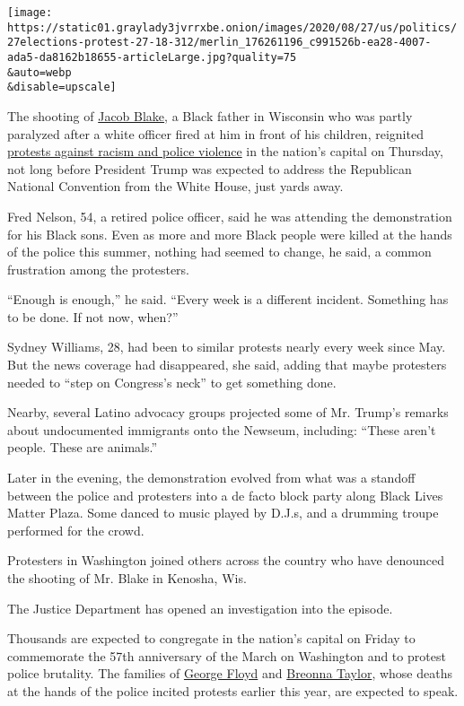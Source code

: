 \texttt{[image: https://static01.graylady3jvrrxbe.onion/images/2020/08/27/us/politics/27elections-protest-27-18-312/merlin\_176261196\_c991526b-ea28-4007-ada5-da8162b18655-articleLarge.jpg?quality=75\\\&auto=webp\\\&disable=upscale]}

The shooting of
\href{https://www.nytimes3xbfgragh.onion/2020/08/27/us/kenosha-shooting-protests.html?name=styln-george-floyd\&region=TOP_BANNER\&variant=1_Show\&block=storyline_menu_recirc\&action=click\&pgtype=Article\&impression_id=7e516e60-e8d7-11ea-93c4-edef82735b0d}{Jacob
Blake}, a Black father in Wisconsin who was partly paralyzed after a
white officer fired at him in front of his children, reignited
\href{https://www.nytimes3xbfgragh.onion/news-event/george-floyd-protests-minneapolis-new-york-los-angeles}{protests
against racism and police violence} in the nation's capital on Thursday,
not long before President Trump was expected to address the Republican
National Convention from the White House, just yards away.

Fred Nelson, 54, a retired police officer, said he was attending the
demonstration for his Black sons. Even as more and more Black people
were killed at the hands of the police this summer, nothing had seemed
to change, he said, a common frustration among the protesters.

``Enough is enough,'' he said. ``Every week is a different incident.
Something has to be done. If not now, when?''

Sydney Williams, 28, had been to similar protests nearly every week
since May. But the news coverage had disappeared, she said, adding that
maybe protesters needed to ``step on Congress's neck'' to get something
done.

Nearby, several Latino advocacy groups projected some of Mr. Trump's
remarks about undocumented immigrants onto the Newseum, including:
``These aren't people. These are animals.''

Later in the evening, the demonstration evolved from what was a standoff
between the police and protesters into a de facto block party along
Black Lives Matter Plaza. Some danced to music played by D.J.s, and a
drumming troupe performed for the crowd.

Protesters in Washington joined others across the country who have
denounced the shooting of Mr. Blake in Kenosha, Wis.

The Justice Department has opened an investigation into the episode.

Thousands are expected to congregate in the nation's capital on Friday
to commemorate the 57th anniversary of the March on Washington and to
protest police brutality. The families of
\href{https://www.nytimes3xbfgragh.onion/2020/05/31/us/george-floyd-investigation.html}{George
Floyd} and
\href{https://www.nytimes3xbfgragh.onion/article/breonna-taylor-police.html}{Breonna
Taylor}, whose deaths at the hands of the police incited protests
earlier this year, are expected to speak.

